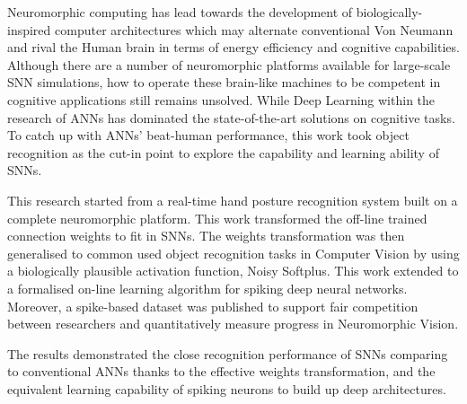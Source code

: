 Neuromorphic computing has lead towards the development of biologically-inspired computer architectures which may alternate conventional Von Neumann and rival the Human brain in terms of energy efficiency and cognitive capabilities.
Although there are a number of neuromorphic platforms available for large-scale SNN simulations, how to operate these brain-like machines to be competent in cognitive applications still remains unsolved.
While Deep Learning within the research of ANNs has dominated the state-of-the-art solutions on cognitive tasks.
To catch up with ANNs' beat-human performance, this work took object recognition as the cut-in point to explore the capability and learning ability of SNNs.

This research started from a real-time hand posture recognition system built on a complete neuromorphic platform.
This work transformed the off-line trained connection weights to fit in SNNs.
The weights transformation was then generalised to common used object recognition tasks in Computer Vision by using a biologically plausible activation function, Noisy Softplus.
This work extended to a formalised on-line learning algorithm for spiking deep neural networks.
Moreover, a spike-based dataset was published to support fair competition between researchers and quantitatively measure progress in Neuromorphic Vision.

The results demonstrated the close recognition performance of SNNs comparing to conventional ANNs thanks to the effective weights transformation, and the equivalent learning capability of spiking neurons to build up deep architectures.
